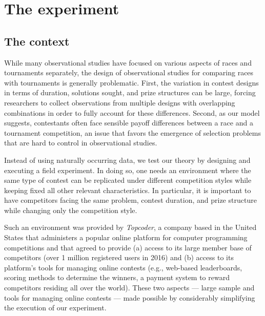 \documentclass[11pt, titlepage]{article}
\begin{document}
\section{The experiment}\label{the-experiment}

\subsection{The context}\label{the-context}

While many observational studies have focused on various aspects of
races and tournaments separately, the design of observational studies
for comparing races with tournaments is generally problematic. First,
the variation in contest designs in terms of duration, solutions sought,
and prize structures can be large, forcing researchers to collect
observations from multiple designs with overlapping combinations in
order to fully account for these differences. Second, as our model
suggests, contestants often face sensible payoff differences between a
race and a tournament competition, an issue that favors the emergence of
selection problems that are hard to control in observational studies.

Instead of using naturally occurring data, we test our theory by
designing and executing a field experiment. In doing so, one needs an
environment where the same type of contest can be replicated under
different competition styles while keeping fixed all other relevant
characteristics. In particular, it is important to have competitors
facing the same problem, contest duration, and prize structure while
changing only the competition style.

Such an environment was provided by \emph{Topcoder}, a company based in
the United States that administers a popular online platform for
computer programming competitions and that agreed to provide (a) access
to its large member base of competitors (over 1 million registered users
in 2016) and (b) access to its platform's tools for managing online
contests (e.g., web-based leaderboards, scoring methods to determine the
winners, a payment system to reward competitors residing all over the
world). These two aspects --- large sample and tools for managing online
contests --- made possible by considerably simplifying the execution of
our experiment.
\end{document}

